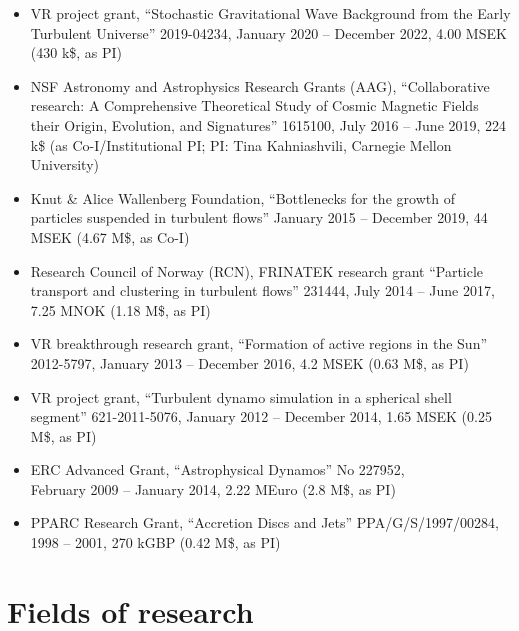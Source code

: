 \documentclass{article}
\begin{document}
\begin{itemize}

\item
VR project grant, ``Stochastic Gravitational Wave Background from the Early Turbulent Universe''
2019-04234, January 2020 -- December 2022, 4.00 MSEK (430 k\$, as PI)

\item
NSF Astronomy and Astrophysics Research Grants (AAG),
``Collaborative research: A Comprehensive Theoretical Study of Cosmic
Magnetic Fields their Origin, Evolution, and Signatures''
1615100, July 2016 -- June 2019, 224 k\$ (as Co-I/Institutional PI;
PI: Tina Kahniashvili, Carnegie Mellon University)

\item
Knut \& Alice Wallenberg Foundation,
``Bottlenecks for the growth of particles suspended in turbulent flows''
January 2015 -- December 2019, 44 MSEK (4.67 M\$, as Co-I)

\item
Research Council of Norway (RCN), FRINATEK research grant
``Particle transport and clustering in turbulent flows''
231444, July 2014 -- June 2017, 7.25 MNOK
(1.18 M\$, as PI)

\item
VR breakthrough research grant, ``Formation of active regions in the Sun''
2012-5797, January 2013 -- December 2016, 4.2 MSEK
(0.63 M\$, as PI)

\item
VR project grant, ``Turbulent dynamo simulation in a spherical shell segment''
621-2011-5076, January 2012 -- December 2014, 1.65 MSEK
(0.25 M\$, as PI)

\item
ERC Advanced Grant, ``Astrophysical Dynamos'' No 227952,\\
February 2009 -- January 2014, 2.22 MEuro
(2.8 M\$, as PI)

\item
PPARC Research Grant, ``Accretion Discs and Jets'' PPA/G/S/1997/00284,\\
1998 -- 2001, 270 kGBP
(0.42 M\$, as PI)

\end{itemize}

\section*{Fields of research}
\end{document}
